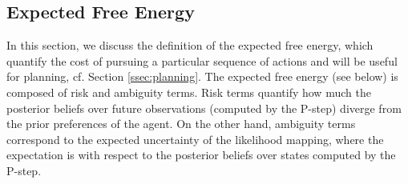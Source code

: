 \documentclass[twoside,11pt]{article}
\begin{document}
\subsection{Expected Free Energy} \label{ssec:efe}

In this section, we discuss the definition of the expected free energy, which quantify the cost of pursuing a particular sequence of actions and will be useful for planning, cf. Section \ref{ssec:planning}. The expected free energy (see below) is composed of risk and ambiguity terms. Risk terms quantify how much the posterior beliefs over future observations (computed by the P-step) diverge from the prior preferences of the agent. On the other hand, ambiguity terms correspond to the expected uncertainty of the likelihood mapping, where the expectation is with respect to the posterior beliefs over states computed by the P-step.
\end{document}
